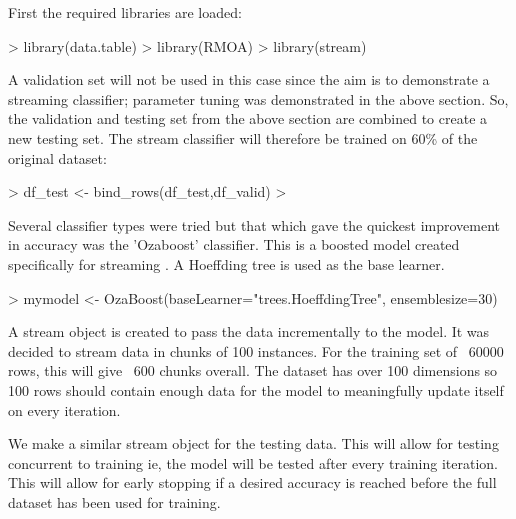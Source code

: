 \documentclass[10pt]{article}
\begin{document}
First the required libraries are loaded:
\begin{Schunk}
\begin{Sinput}
> library(data.table)
> library(RMOA)
> library(stream)
\end{Sinput}
\end{Schunk}

A validation set will not be used in this case since the aim is to demonstrate a streaming classifier; parameter tuning was demonstrated in the above section. So, the validation and testing set from the above section are combined to create a new testing set. The stream classifier will therefore be trained on 60\% of the original dataset:
\begin{Schunk}
\begin{Sinput}
> df_test <- bind_rows(df_test,df_valid)
> 
\end{Sinput}
\end{Schunk}
Several classifier types were tried but that which gave the quickest improvement in accuracy was the 'Ozaboost' classifier. This is a boosted model created specifically for streaming \cite{6934280}. A Hoeffding tree is used as the base learner.
\begin{Schunk}
\begin{Sinput}
> mymodel <- OzaBoost(baseLearner="trees.HoeffdingTree", ensemblesize=30)
\end{Sinput}
\end{Schunk}
A stream object is created to pass the data incrementally to the model. It was decided to stream data in chunks of 100 instances. For the training set of ~60000 rows, this will give ~600 chunks overall. The dataset has over 100 dimensions so 100 rows should contain enough data for the model to meaningfully update itself on every iteration.
\begin{Schunk}
\end{Schunk}
We make a similar stream object for the testing data. This will allow for testing concurrent to training ie, the model will be tested after every training iteration. This will allow for early stopping if a desired accuracy is reached before the full dataset has been used for training.\\
\end{document}
